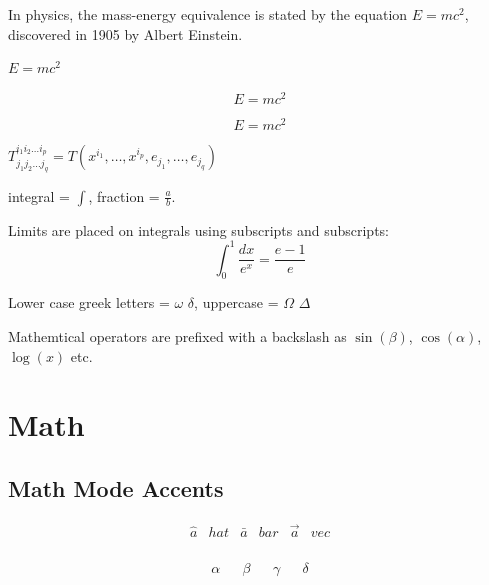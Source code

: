 \documentclass[12pt, a4paper]{article} %
\begin{document}
In physics, the mass-energy equivalence is stated by the equation $E=mc^2$, discovered in 1905 by Albert Einstein.

\begin{math}
	E=mc^2
\end{math}

\[E=mc^2\]

\begin{equation}
	E=mc^2
\end{equation}

\begin{math}
	T^{i_1 i_2 \dots i_p}_{j_1 j_2 \dots j_q} = T(x^{i_1}, \dots, x^{i_p}, e_{j_1}, \dots, e_{j_q})
\end{math}

\vspace{5mm}

integral = $\int$, fraction = $\frac{a}{b}$.

Limits are placed on integrals using subscripts and subscripts:
\[ \int_0^1 \frac{dx}{e^x} = \frac{e-1}{e}\]

Lower case greek letters = $\omega$ $\delta$, uppercase = $\Omega$ $\Delta$

Mathemtical operators are prefixed with a backslash as $\sin(\beta)$, $\cos(\alpha)$, $\log(x)$ etc.

\section{Math}

\subsection{Math Mode Accents}

\begin{align*}
    \hat{a}&hat & \bar{a}&bar & \vec{a}&vec \\
\end{align*}

\begin{align*}
    \alpha && \beta && \gamma && \delta \\

\end{align*}
\end{document}
